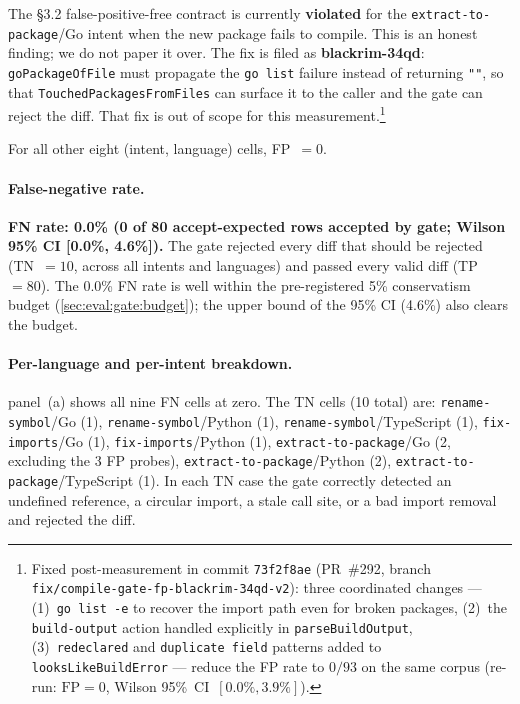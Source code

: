 The §3.2 false-positive-free contract is currently \textbf{violated}
for the \texttt{extract-to-package}/Go intent when the new package
fails to compile.  This is an honest finding; we do not paper it over.
The fix is filed as \textbf{blackrim-34qd}: \texttt{goPackageOfFile}
must propagate the \texttt{go list} failure instead of returning
\texttt{""}, so that \texttt{TouchedPackagesFromFiles} can surface it
to the caller and the gate can reject the diff.  That fix is out of
scope for this measurement.\footnote{Fixed post-measurement in commit
\texttt{73f2f8ae} (PR~\#292, branch
\texttt{fix/compile-gate-fp-blackrim-34qd-v2}): three coordinated
changes --- (1)~\texttt{go list -e} to recover the import path even
for broken packages, (2)~the \texttt{build-output} action handled
explicitly in \texttt{parseBuildOutput}, (3)~\texttt{redeclared} and
\texttt{duplicate field} patterns added to \texttt{looksLikeBuildError}
--- reduce the FP rate to $0/93$ on the same corpus (re-run:
$\text{FP} = 0$, Wilson 95\%\ CI~$[0.0\%, 3.9\%]$).}

For all other eight (intent, language) cells, FP~$= 0$.

\paragraph{False-negative rate.}
\textbf{FN rate: 0.0\% (0 of 80 accept-expected rows accepted by gate;
Wilson 95\% CI [0.0\%, 4.6\%]).}
The gate rejected every diff that should be rejected (TN~$= 10$, across
all intents and languages) and passed every valid diff (TP~$= 80$).
The 0.0\% FN rate is well within the pre-registered 5\% conservatism
budget (\cref{sec:eval:gate:budget}); the upper bound of the 95\% CI
(4.6\%) also clears the budget.

\paragraph{Per-language and per-intent breakdown.}
 panel~(a) shows all nine FN cells at zero.
The TN cells (10 total) are: \texttt{rename-symbol}/Go (1),
\texttt{rename-symbol}/Python (1), \texttt{rename-symbol}/TypeScript (1),
\texttt{fix-imports}/Go (1), \texttt{fix-imports}/Python (1),
\texttt{extract-to-package}/Go (2, excluding the 3 FP probes),
\texttt{extract-to-package}/Python (2),
\texttt{extract-to-package}/TypeScript (1).
In each TN case the gate correctly detected an undefined reference,
a circular import, a stale call site, or a bad import removal and
rejected the diff.

